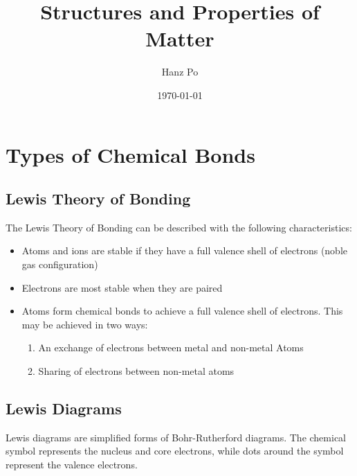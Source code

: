 \documentclass[letterpaper]{article}
\title{\huge Structures and Properties of Matter}
\author{Hanz Po}
\date{\today}
\begin{document}
\maketitle



\section{Types of Chemical Bonds}

\subsection{Lewis Theory of Bonding}

The Lewis Theory of Bonding can be described with the following characteristics:
\begin{itemize}
  \item Atoms and ions are stable if they have a full valence shell of electrons (noble gas configuration)
  \item Electrons are most stable when they are paired
  \item Atoms form chemical bonds to achieve a full valence shell of electrons. This may be achieved in two ways:
  \begin{enumerate}
    \item An exchange of electrons between metal and non-metal Atoms
    \item Sharing of electrons between non-metal atoms
  \end{enumerate}
\end{itemize}

\subsection{Lewis Diagrams}

Lewis diagrams are simplified forms of Bohr-Rutherford diagrams. The chemical symbol represents the nucleus and core electrons, while dots around the symbol represent the valence electrons.

\end{document}
